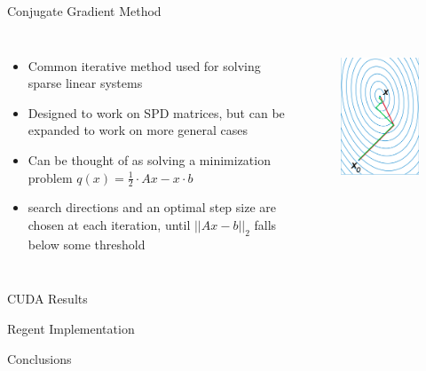\documentclass[10pt]{beamer}
\begin{document}
\begin{frame}{Conjugate Gradient Method}
	
	\begin{columns}
	\begin{itemize}
		\item Common iterative method used for solving sparse linear systems	
		
		\item Designed to work on SPD matrices, but can be expanded to work on more general cases
		
		\item Can be thought of as solving a minimization problem $q(x) = \frac{1}{2} \cdot Ax - x \cdot b$
		
		\item search directions and an optimal step size are chosen at each iteration, until $|| Ax - b ||_{2}$ falls below some threshold
		
	\end{itemize}
	\begin{figure}[H]
		\centering
		\includegraphics[scale=0.50]{CG_vis.png}
		\label{fig:CG_vis} 
	\end{figure}
	\end{columns}		
	
\end{frame}

\begin{frame}{CUDA Results}
	
\end{frame}


\begin{frame}{Regent Implementation}
	
\end{frame}


\begin{frame}{Conclusions}
	
\end{frame}
\end{document}
